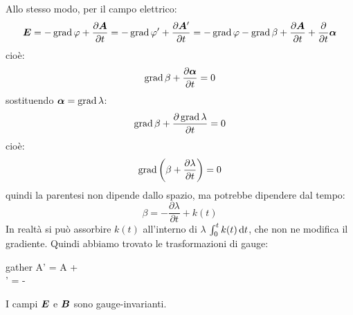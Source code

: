 Allo stesso modo, per il campo elettrico:
\begin{equation}
  \boldsymbol{E} = -\operatorname{grad}\varphi + \frac{\partial\boldsymbol{A}}{\partial t} = -\operatorname{grad}\varphi' + \frac{\partial\boldsymbol{A}'}{\partial t} = -\operatorname{grad}\varphi -\operatorname{grad}\beta +  \frac{\partial\boldsymbol{A}}{\partial t} +\frac{\partial}{\partial t}\boldsymbol{\alpha}
\end{equation}
cioè:
\begin{equation}
\operatorname{grad}\beta + \frac{\partial\boldsymbol{\alpha}}{\partial t} = 0
\end{equation}
sostituendo $\boldsymbol{\alpha}=\operatorname{grad}\lambda$:
\begin{equation}
  \operatorname{grad}\beta + \frac{\partial\operatorname{grad} \lambda}{\partial t} = 0
\end{equation}
cioè:
\begin{equation}
  \operatorname{grad}\left(\beta + \frac{\partial\lambda}{\partial t}\right) = 0
\end{equation}
quindi la parentesi non dipende dallo spazio, ma potrebbe dipendere dal tempo:
\begin{equation}
  \beta =- \frac{\partial\lambda}{\partial t} +k(t)
\end{equation}
In realtà si può assorbire $k(t)$ all'interno di $\lambda$ $\int_0^t k(t)\,\mathrm{d} t$, che non ne modifica il gradiente. Quindi abbiamo trovato le trasformazioni di gauge:
\begin{eqimp}{gather}
\ve A' = \ve A + \grad\lambda \\
\varphi' = \varphi - 
\end{eqimp}
I campi $\boldsymbol{E}$ e $\boldsymbol{B}$ sono gauge-invarianti.



